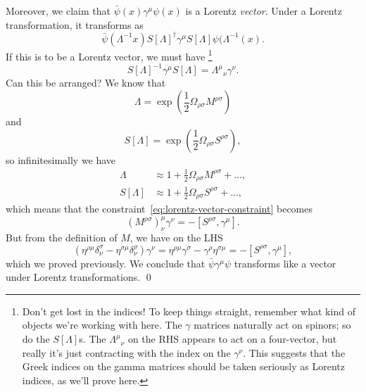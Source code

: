 Moreover, we claim that $\bar\psi(x)\gamma^\mu \psi(x)$ is a Lorentz \emph{vector}. Under a Lorentz transformation, it transforms as
\begin{equation}
    \bar\psi(\Lambda^{-1}x)S[\Lambda]^\dagger \gamma^\mu S[\Lambda]\psi(\Lambda^{-1}(x).
\end{equation}
If this is to be a Lorentz vector, we must have%
    \footnote{Don't get lost in the indices! To keep things straight, remember what kind of objects we're working with here. The $\gamma$ matrices naturally act on spinors; so do the $S[\Lambda]$s. The $\Lambda^\mu{}_\nu$ on the RHS appears to act on a four-vector, but really it's just contracting with the index on the $\gamma^\nu$. This suggests that the Greek indices on the gamma matrices should be taken seriously as Lorentz indices, as we'll prove here.}
\begin{equation}\label{eq:lorentz-vector-constraint}
    S[\Lambda]^{-1} \gamma^\mu S[\Lambda]=\Lambda^\mu{}_\nu \gamma^\nu.
\end{equation}
Can this be arranged? We know that
\begin{equation}
    \Lambda = \exp\left(\frac{1}{2}\Omega_{\rho\sigma}M^{\rho\sigma}\right)
\end{equation}
and
\begin{equation}
    S[\Lambda]=\exp\left(\frac{1}{2}\Omega_{\rho\sigma}S^{\rho\sigma}\right),
\end{equation}
so infinitesimally we have
\begin{align}
    \Lambda &\approx 1 + \frac{1}{2} \Omega_{\rho\sigma} M^{\rho\sigma} + \dots,\\
    S[\Lambda] &\approx 1 + \frac{1}{2} \Omega_{\rho\sigma} S^{\rho\sigma} + \dots,
\end{align}
which means that the constraint~\eqref{eq:lorentz-vector-constraint} becomes
\begin{equation}
    (M^{\rho\sigma})^\mu_\nu \gamma^\nu = -[S^{\rho\sigma},\gamma^\mu].
\end{equation}
But from the definition of $M$, we have on the LHS
$$(\eta^{\rho\mu}\delta^\sigma_\nu-\eta^{\sigma\mu}\delta^\rho_\nu)\gamma^\nu =\eta^{\rho\mu}\gamma^\sigma - \gamma^\rho \eta^{\sigma\mu}=-[S^{\rho\sigma},\gamma^\mu],$$
which we proved previously. We conclude that $\bar \psi \gamma^\mu \psi$ transforms like a vector under Lorentz transformations. \qed

